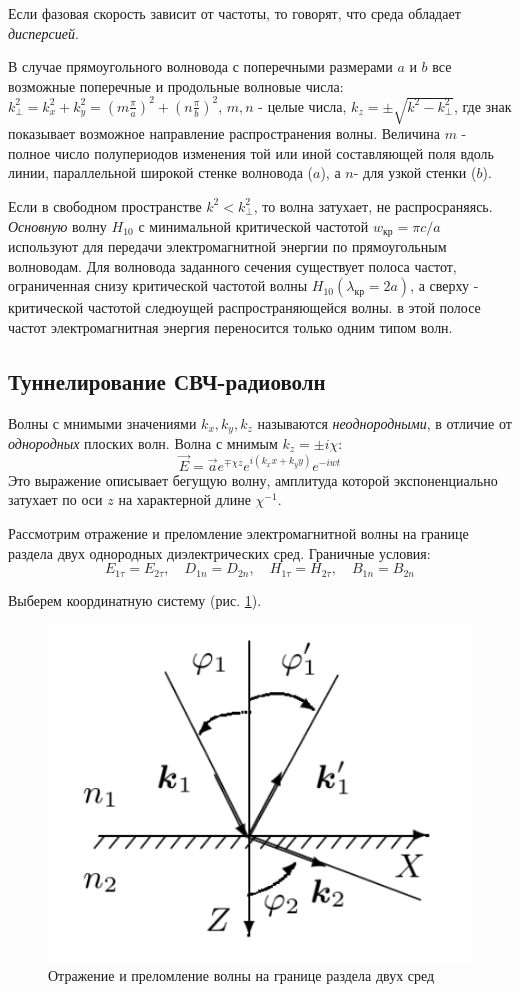 \documentclass[a4paper,12pt]{article}
\begin{document}
Если фазовая скорость зависит от частоты, то говорят, что среда обладает \textit{дисперсией}. 

В случае прямоугольного волновода с поперечными размерами $a$ и $b$ все возможные поперечные и продольные волновые числа: $k_\perp^2=k_x^2+k_y^2=(m\frac{\pi}{a})^2+(n\frac{\pi}{b})^2$, $m, n$ - целые числа, $k_z = \pm\sqrt{k^2-k_\perp^2}$, где знак показывает возможное направление распространения волны. Величина $m$ - полное число полупериодов изменения той или иной составляющей поля вдоль линии, параллельной широкой стенке волновода ($a$), а $n$- для узкой стенки ($b$).

Если в свободном пространстве $k^2 < k_\perp^2$, то волна затухает, не распросраняясь. \textit{Основную} волну $H_{10}$ с минимальной критической частотой $w_{\text{кр}}=\pi c/a$ используют для передачи электромагнитной энергии по прямоугольным волноводам. Для волновода заданного сечения существует полоса частот, ограниченная снизу критической частотой волны $H_{10} (\lambda_{\text{кр}}=2a)$, а сверху - критической частотой следюущей распространяющейся волны. в этой полосе частот электромагнитная энергия переносится только одним типом волн.

\newpage
\subsection{Туннелирование СВЧ-радиоволн}

Волны с мнимыми значениями $k_x, k_y, k_z$ называются \textit{неоднородными}, в отличие от \textit{однородных} плоских волн. Волна с мнимым $k_z=\pm i\chi$:
$$
\vec{E} = \vec{a}e^{\mp \chi z}e^{i(k_xx+k_yy)}e^{-iwt}
$$
Это выражение описывает бегущую волну, амплитуда которой экспоненциально затухает по оси $z$ на характерной длине $\chi^{-1}$.

Рассмотрим отражение и преломление электромагнитной волны на границе раздела двух однородных диэлектрических сред. Граничные условия:
$$
E_{1\tau}=E_{2\tau}, \quad D_{1n}=D_{2n}, \quad H_{1\tau}=H_{2\tau}, \quad B_{1n}=B_{2n}
$$

Выберем координатную систему (рис. \ref{img3}).

\begin{figure}[h]
\centering
\includegraphics[width=0.3\linewidth]{img3.png}
\caption{Отражение и преломление волны на границе раздела двух сред}
\label{img3}
\end{figure}
\end{document}
